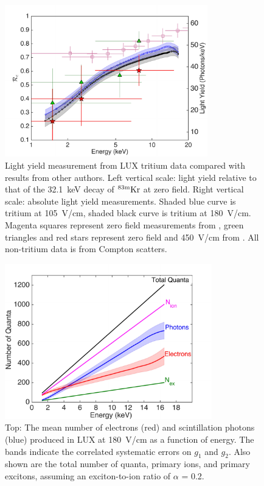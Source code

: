 \begin{figure}[t!]
\includegraphics[width=88mm]{fig8.pdf}
\caption{Light yield measurement from LUX tritium data compared with results from other authors. Left vertical scale: light yield relative to that of the 32.1~keV decay of $\rm ^{83m}Kr $ at zero field. Right vertical scale: absolute light yield measurements. Shaded blue curve is tritium at 105~V/cm, shaded black curve is tritium at 180~V/cm. Magenta squares represent zero field measurements from \cite{Aprile_LY}, green triangles and red stars represent zero field and 450~V/cm from \cite{Baudis}. All non-tritium data is from Compton scatters. }
\label{fig:Re_LY}
\end{figure}

\begin{figure}[t!]
\includegraphics[width=90mm]{fig9.pdf}
\caption{Top: The mean number of electrons (red) and scintillation photons (blue) produced in LUX at 180~V/cm as a function of energy. The bands indicate the correlated systematic errors on $g_1$ and $g_2$. Also shown are the total number of quanta, primary ions, and primary excitons, assuming an exciton-to-ion ratio of $\alpha$ = 0.2. }
\label{fig:quanta-vs-energy}
\end{figure}

